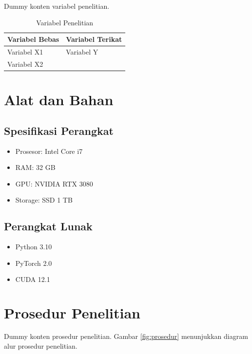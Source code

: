 Dummy konten variabel penelitian.

\begin{table}[h]
    \centering
    \caption{Variabel Penelitian}
    \label{tab:variabel}
    \begin{tabularx}{\textwidth}{X X}
        \toprule
        \textbf{Variabel Bebas} & \textbf{Variabel Terikat} \\
        \midrule
        Variabel X1 & Variabel Y \\
        Variabel X2 & \\
        \bottomrule
    \end{tabularx}
\end{table}

\section{Alat dan Bahan}
\label{sec:alat_bahan}

\subsection{Spesifikasi Perangkat}
\label{subsec:perangkat}

\begin{itemize}
    \item Prosesor: Intel Core i7
    \item RAM: 32 GB
    \item GPU: NVIDIA RTX 3080
    \item Storage: SSD 1 TB
\end{itemize}

\subsection{Perangkat Lunak}
\label{subsec:perangkat_lunak}

\begin{itemize}
    \item Python 3.10
    \item PyTorch 2.0
    \item CUDA 12.1
\end{itemize}

\section{Prosedur Penelitian}
\label{sec:prosedur}

Dummy konten prosedur penelitian. Gambar \ref{fig:prosedur} menunjukkan diagram alur prosedur penelitian.

